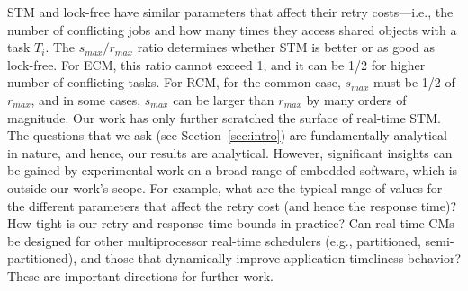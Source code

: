\documentclass{sig-alternate}
\begin{document}
STM and lock-free have similar parameters that affect their retry costs---i.e., the number of conflicting jobs and how many times they access shared objects with a task $T_i$. The $s_{max}/r_{max}$ ratio determines whether STM is better or as good as lock-free. For ECM, this ratio cannot exceed 1, and it can be 1/2 for higher number of conflicting tasks. For RCM, for the common case, $s_{max}$ must be 1/2 of $r_{max}$, and in some cases, $s_{max}$ can be larger than $r_{max}$ by many orders of magnitude.
Our work has only further scratched the surface of real-time STM. The questions that we ask (see Section~\ref{sec:intro}) are fundamentally analytical in nature, and hence, our results are analytical. However, significant insights can be gained by experimental work on a broad range of embedded software, which is outside our work's scope. For example, what are the typical range of values for the different parameters that affect the retry cost (and hence the response time)? How tight is our retry and response time bounds in practice? Can real-time CMs be designed for other multiprocessor real-time schedulers (e.g., partitioned, semi-partitioned), and those that dynamically improve application timeliness behavior? These are important directions for further work. 




\end{document}
